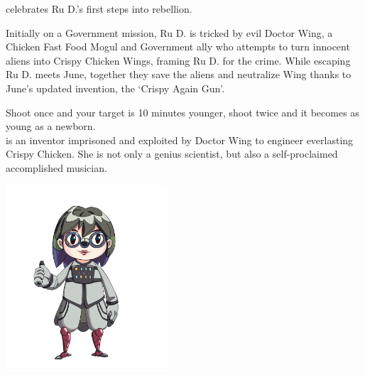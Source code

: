 \clearpage 
{}

 celebrates Ru D.'s first steps into rebellion. 

Initially on a Government mission, Ru D. is tricked by evil Doctor Wing, a Chicken Fast Food Mogul and Government ally who attempts to turn innocent aliens into Crispy Chicken Wings, framing Ru D. for the crime. While escaping Ru D. meets June, together they save the aliens and neutralize Wing thanks to June's updated invention, the `Crispy Again Gun'.

Shoot once and your target is 10 minutes younger, shoot twice and it becomes as young as a newborn.\\

 is an inventor imprisoned and exploited by Doctor Wing to engineer everlasting Crispy Chicken. She is not only a genius scientist, but also a self-proclaimed accomplished musician.

\begin{center}
\includegraphics[width=0.45\textwidth]{Assets/june}
\end{center}

\clearpage